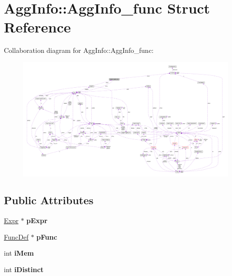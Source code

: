 \hypertarget{struct_agg_info_1_1_agg_info__func}{\section{Agg\-Info\-:\-:Agg\-Info\-\_\-func Struct Reference}
\label{struct_agg_info_1_1_agg_info__func}
}


Collaboration diagram for Agg\-Info\-:\-:Agg\-Info\-\_\-func\-:\nopagebreak
\begin{figure}[H]
\begin{center}
\leavevmode
\includegraphics[width=350pt]{struct_agg_info_1_1_agg_info__func__coll__graph}
\end{center}
\end{figure}
\subsection*{Public Attributes}
\begin{DoxyCompactItemize}
\item 
\hypertarget{struct_agg_info_1_1_agg_info__func_a7b92e1c42e60d44e28ebf695316f4018}{\hyperlink{struct_expr}{Expr} $\ast$ {\bfseries p\-Expr}}\label{struct_agg_info_1_1_agg_info__func_a7b92e1c42e60d44e28ebf695316f4018}

\item 
\hypertarget{struct_agg_info_1_1_agg_info__func_a840478e8ec53cefa57b50228f6fdafe4}{\hyperlink{struct_func_def}{Func\-Def} $\ast$ {\bfseries p\-Func}}\label{struct_agg_info_1_1_agg_info__func_a840478e8ec53cefa57b50228f6fdafe4}

\item 
\hypertarget{struct_agg_info_1_1_agg_info__func_a41a8da36555c37fffc65f1acead49a4f}{int {\bfseries i\-Mem}}\label{struct_agg_info_1_1_agg_info__func_a41a8da36555c37fffc65f1acead49a4f}

\item 
\hypertarget{struct_agg_info_1_1_agg_info__func_a4a82635b0116eb44ec8ca9e47cc509d9}{int {\bfseries i\-Distinct}}\label{struct_agg_info_1_1_agg_info__func_a4a82635b0116eb44ec8ca9e47cc509d9}

\end{DoxyCompactItemize}


